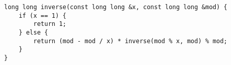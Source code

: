 \begin{lstlisting}
long long inverse(const long long &x, const long long &mod) {
    if (x == 1) {
        return 1;
    } else {
        return (mod - mod / x) * inverse(mod % x, mod) % mod;
    }
}
\end{lstlisting}
